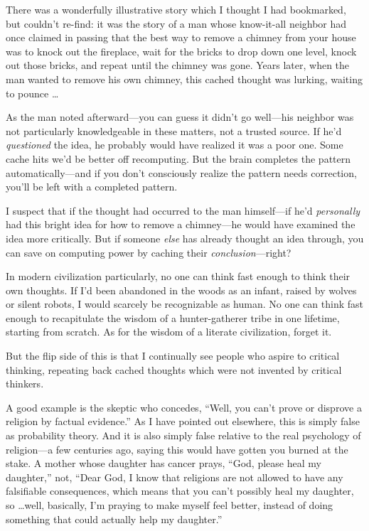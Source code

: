 {
 There was a wonderfully illustrative story which I thought I had
bookmarked, but couldn't re-find: it was the story of a
man whose know-it-all neighbor had once claimed in passing that the
best way to remove a chimney from your house was to knock out the
fireplace, wait for the bricks to drop down one level, knock out those
bricks, and repeat until the chimney was gone. Years later, when the
man wanted to remove his own chimney, this cached thought was lurking,
waiting to pounce \ldots}

{
 As the man noted afterward---you can guess it
didn't go well---his neighbor was not particularly
knowledgeable in these matters, not a trusted source. If
he'd \textit{questioned} the idea, he probably would
have realized it was a poor one. Some cache hits we'd
be better off recomputing. But the brain completes the pattern
automatically---and if you don't consciously realize
the pattern needs correction, you'll be left with a
completed pattern.}

{
 I suspect that if the thought had occurred to the man himself---if
he'd \textit{personally} had this bright idea for how
to remove a chimney---he would have examined the idea more critically.
But if someone \textit{else} has already thought an idea through, you
can save on computing power by caching their
\textit{conclusion}{}---right?}

{
 In modern civilization particularly, no one can think fast enough
to think their own thoughts. If I'd been abandoned in
the woods as an infant, raised by wolves or silent robots, I would
scarcely be recognizable as human. No one can think fast enough to
recapitulate the wisdom of a hunter-gatherer tribe in one lifetime,
starting from scratch. As for the wisdom of a literate civilization,
forget it.}

{
 But the flip side of this is that I continually see people who
aspire to critical thinking, repeating back cached thoughts which were
not invented by critical thinkers.}

{
 A good example is the skeptic who concedes,
``Well, you can't prove or disprove a
religion by factual evidence.'' As I have pointed out
elsewhere, this is simply false as probability theory. And it is also
simply false relative to the real psychology of religion---a few
centuries ago, saying this would have gotten you burned at the stake. A
mother whose daughter has cancer prays, ``God, please
heal my daughter,'' not, ``Dear God,
I know that religions are not allowed to have any falsifiable
consequences, which means that you can't possibly heal
my daughter, so \ldots well, basically, I'm praying to
make myself feel better, instead of doing something that could actually
help my daughter.''}

